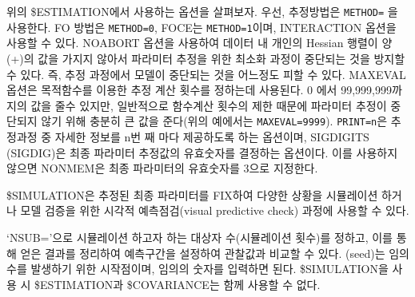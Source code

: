 \documentclass[
  11pt,
  krantz2, a4paper, twoside]{krantz}
\newenvironment{Shaded}{\begin{snugshade}}{\end{snugshade}}
\newcommand{\DataTypeTok}[1]{\textcolor[rgb]{0.13,0.29,0.53}{#1}}
\newcommand{\DecValTok}[1]{\textcolor[rgb]{0.00,0.00,0.81}{#1}}
\newcommand{\NormalTok}[1]{#1}
\theoremstyle{definition}
\theoremstyle{definition}
\theoremstyle{definition}
\theoremstyle{remark}
\begin{document}
위의 \$ESTIMATION에서 사용하는 옵션을 살펴보자. 우선, 추정방법은 \texttt{METHOD=} 을 사용한다. FO 방법은 \texttt{METHOD=0}, FOCE는 \texttt{METHOD=1}이며, INTERACTION 옵션을 사용할 수 있다. NOABORT 옵션을 사용하여 데이터 내 개인의 Hessian 행렬이 양(+)의 값을 가지지 않아서 파라미터 추정을 위한 최소화 과정이 중단되는 것을 방지할 수 있다. 즉, 추정 과정에서 모델이 중단되는 것을 어느정도 피할 수 있다. MAXEVAL 옵션은 목적함수를 이용한 추정 계산 횟수를 정하는데 사용된다. 0 에서 99,999,999까지의 값을 줄수 있지만, 일반적으로 함수계산 횟수의 제한 때문에 파라미터 추정이 중단되지 않기 위해 충분히 큰 값을 준다(위의 예에서는 \texttt{MAXEVAL=9999}). \texttt{PRINT=n}은 추정과정 중 자세한 정보를 n번 째 마다 제공하도록 하는 옵션이며, SIGDIGITS (SIGDIG)은 최종 파라미터 추정값의 유효숫자를 결정하는 옵션이다. 이를 사용하지 않으면 NONMEM은 최종 파라미터의 유효숫자를 3으로 지정한다.

\$SIMULATION은 추정된 최종 파라미터를 FIX하여 다양한 상황을 시뮬레이션 하거나 모델 검증을 위한 시각적 예측점검(visual predictive check) 과정에 사용할 수 있다.

\begin{Shaded}
\end{Shaded}

`NSUB='으로 시뮬레이션 하고자 하는 대상자 수(시뮬레이션 횟수)를 정하고, 이를 통해 얻은 결과를 정리하여 예측구간을 설정하여 관찰값과 비교할 수 있다. (seed)는 임의 수를 발생하기 위한 시작점이며, 임의의 숫자를 입력하면 된다. \$SIMULATION을 사용 시 \$ESTIMATION과 \$COVARIANCE는 함께 사용할 수 없다.
\end{document}
